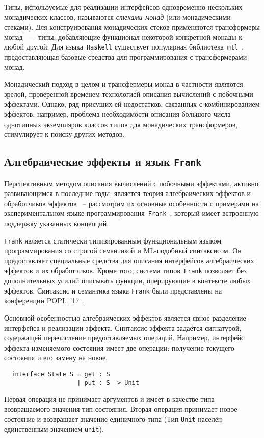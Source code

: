 \documentclass [a4paper] {article}
\begin{document}
Типы, используемые для реализации интерфейсов одновременно нескольких
монадических классов, называются \emph{стеками монад} (или монадическими стеками). Для конструирования
монадических стеков применяются трансформеры монад~\cite{monadTransformers}
--- типы,
добавляющие функционал некоторой конкретной монады к любой другой. Для
языка~\texttt{Haskell} существует популярная библиотека~\texttt{mtl}~\cite{mtlHackage},
предоставляющая базовые средства для программирования с трансформерами монад.

Монадический подход в целом и трансфермеры монад в частности являются зрелой,
проверенной временем технологией описания вычислений с побочными эффектами.
Однако, ряд присущих ей недостатков, связанных с комбинированием эффектов,
например, проблема необходимости описания большого числа однотипных
экземпляров классов типов для монадических трансформеров, стимулирует к поиску других методов.

\subsection{Алгебраические эффекты и язык \texttt{Frank}}

Перспективным методом описания вычислений с побочными эффектами, активно
развивающимся в последние годы, является теория алгебраических
эффектов и обработчиков эффектов~\cite{AlgEffects} -- рассмотрим их основные особенности с примерами на экспериментальном языке
программирования~\texttt{Frank}~\cite{Frank}, который имеет встроенную
поддержку указанных концепций.

\texttt{Frank} является статически типизированным функциональным
языком программирования со строгой семантикой и ML-подобный синтаксисом. Он предоставляет специальные средства для
описания интерфейсов алгебраических эффектов и их обработчиков.
Кроме того, система типов~\texttt{Frank} позволяет без дополнительных усилий описывать
функции, оперирующие в контексте любых эффектов. Синтаксис и семантика языка
\texttt{Frank} были представлены на конференции POPL~'17~\cite{Frank}.

Основной особенностью алгебраических эффектов является явное разделение
интерфейса и реализации эффекта. Синтаксис эффекта задаётся сигнатурой,
содержащей перечисление предоставляемых операций. Например, интерфейс
эффекта изменяемого состояния имеет две операции: получение текущего
состояния и его замену на новое.
\begin{verbatim}
  interface State S = get : S
                    | put : S -> Unit
\end{verbatim}
Первая операция не принимает аргументов и имеет в качестве типа возвращаемого
значения тип состояния. Вторая операция принимает новое состояние и возвращает
значение единичного типа (Тип \texttt{Unit} населён единственным значением
\texttt{unit}).
\end{document}
